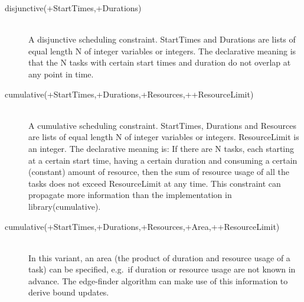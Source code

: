 \begin{description}
\item[disjunctive(+StartTimes,+Durations)]\ \\
A disjunctive scheduling constraint. StartTimes and Durations
are lists of equal length N of integer variables or integers.
The declarative meaning is that the N tasks with certain start times
and duration do not overlap at any point in time.

\item[cumulative(+StartTimes,+Durations,+Resources,++ResourceLimit)]\ \\
A cumulative scheduling constraint. StartTimes, Durations and Resources
are lists of equal length N of integer variables or integers.
ResourceLimit is an integer. The declarative meaning is:
If there are N tasks, each starting at a certain start time, having
a certain duration and consuming a certain (constant) amount of
resource, then the sum of resource usage of all the tasks does not
exceed ResourceLimit at any time.
This constraint can propagate more information than the implementation
in library(cumulative).

\item[cumulative(+StartTimes,+Durations,+Resources,+Area,++ResourceLimit)]\ \\
In this variant, an area (the product of duration and resource usage of
a task) can be specified, e.g.\ if duration or resource usage are not
known in advance. The edge-finder algorithm can make use of this information
to derive bound updates.
\end{description}
